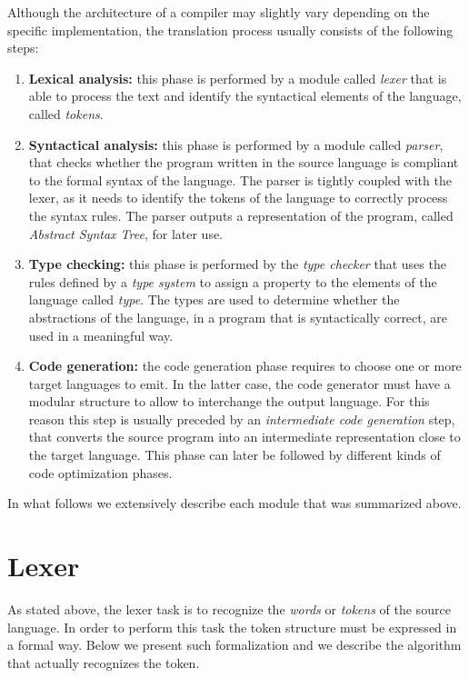 Although the architecture of a compiler may slightly vary depending on the specific implementation, the translation process usually consists of the following steps:

\begin{enumerate}
	\item \textbf{Lexical analysis:} this phase is performed by a module called \textit{lexer} that is able to process the text and identify the syntactical elements of the language, called \textit{tokens}.
	\item \textbf{Syntactical analysis:} this phase is performed by a module called \textit{parser}, that checks whether the program written in the source language is compliant to the formal syntax of the language. The parser is tightly coupled with the lexer, as it needs to identify the tokens of the language to correctly process the syntax rules. The parser outputs a representation of the program, called \textit{Abstract Syntax Tree}, for later use.
	\item \textbf{Type checking:} this phase is performed by the \textit{type checker} that uses the rules defined by a \textit{type system} to assign a property to the elements of the language called \textit{type}. The types are used to determine whether the abstractions of the language, in a program that is syntactically correct, are used in a meaningful way.
	\item \textbf{Code generation:} the code generation phase requires to choose one or more target languages to emit. In the latter case, the code generator must have a modular structure to allow to interchange the output language. For this reason this step is usually preceded by an \textit{intermediate code generation} step, that converts the source program into an intermediate representation close to the target language. This phase can later be followed by different kinds of code optimization phases.
\end{enumerate}

In what follows we extensively describe each module that was summarized above.

\section{Lexer}
\label{sec:ch_background_compiler_lexer}
As stated above, the lexer task is to recognize the \textit{words} or \textit{tokens} of the source language. In order to perform this task the token structure must be expressed in a formal way. Below we present such formalization and we describe the algorithm that actually recognizes the token.

